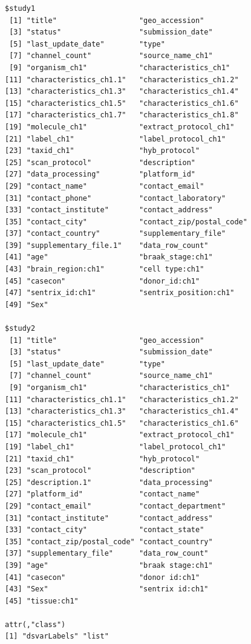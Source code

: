 \documentclass[]{article}
\begin{document}
\begin{verbatim}
$study1
 [1] "title"                   "geo_accession"          
 [3] "status"                  "submission_date"        
 [5] "last_update_date"        "type"                   
 [7] "channel_count"           "source_name_ch1"        
 [9] "organism_ch1"            "characteristics_ch1"    
[11] "characteristics_ch1.1"   "characteristics_ch1.2"  
[13] "characteristics_ch1.3"   "characteristics_ch1.4"  
[15] "characteristics_ch1.5"   "characteristics_ch1.6"  
[17] "characteristics_ch1.7"   "characteristics_ch1.8"  
[19] "molecule_ch1"            "extract_protocol_ch1"   
[21] "label_ch1"               "label_protocol_ch1"     
[23] "taxid_ch1"               "hyb_protocol"           
[25] "scan_protocol"           "description"            
[27] "data_processing"         "platform_id"            
[29] "contact_name"            "contact_email"          
[31] "contact_phone"           "contact_laboratory"     
[33] "contact_institute"       "contact_address"        
[35] "contact_city"            "contact_zip/postal_code"
[37] "contact_country"         "supplementary_file"     
[39] "supplementary_file.1"    "data_row_count"         
[41] "age"                     "braak_stage:ch1"        
[43] "brain_region:ch1"        "cell type:ch1"          
[45] "casecon"                 "donor_id:ch1"           
[47] "sentrix_id:ch1"          "sentrix_position:ch1"   
[49] "Sex"                    

$study2
 [1] "title"                   "geo_accession"          
 [3] "status"                  "submission_date"        
 [5] "last_update_date"        "type"                   
 [7] "channel_count"           "source_name_ch1"        
 [9] "organism_ch1"            "characteristics_ch1"    
[11] "characteristics_ch1.1"   "characteristics_ch1.2"  
[13] "characteristics_ch1.3"   "characteristics_ch1.4"  
[15] "characteristics_ch1.5"   "characteristics_ch1.6"  
[17] "molecule_ch1"            "extract_protocol_ch1"   
[19] "label_ch1"               "label_protocol_ch1"     
[21] "taxid_ch1"               "hyb_protocol"           
[23] "scan_protocol"           "description"            
[25] "description.1"           "data_processing"        
[27] "platform_id"             "contact_name"           
[29] "contact_email"           "contact_department"     
[31] "contact_institute"       "contact_address"        
[33] "contact_city"            "contact_state"          
[35] "contact_zip/postal_code" "contact_country"        
[37] "supplementary_file"      "data_row_count"         
[39] "age"                     "braak stage:ch1"        
[41] "casecon"                 "donor id:ch1"           
[43] "Sex"                     "sentrix id:ch1"         
[45] "tissue:ch1"             

attr(,"class")
[1] "dsvarLabels" "list"       
\end{verbatim}
\end{document}
